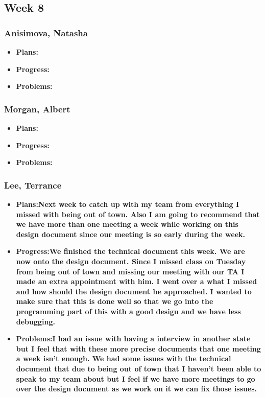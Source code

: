 \documentclass[10pt,draftclsnofoot,onecolumn]{IEEEtran}
\begin{document}
\subsection{Week 8}
\subsubsection{Anisimova, Natasha}
\begin{itemize}
	\item \textbf{Plans:}
	\item \textbf{Progress:}
	\item \textbf{Problems:}
\end{itemize}
\subsubsection{Morgan, Albert}
\begin{itemize}
	\item \textbf{Plans:}
	\item \textbf{Progress:}
	\item \textbf{Problems:}
\end{itemize}
\subsubsection{Lee, Terrance}
\begin{itemize}
	\item \textbf{Plans:Next week to catch up with my team from everything I missed with being out of town. Also I am going to recommend that we have more than one meeting a week while working on this design document since our meeting is so early during the week.}
	\item \textbf{Progress:We finished the technical document this week. We are now onto the design document. Since I missed class on Tuesday from being out of town and missing our meeting with our TA I made an extra appointment with him. I went over a what I missed and how should the design document be approached. I wanted to make sure that this is done well so that we go into the programming part of this with a good design and we have less debugging.}
	\item \textbf{Problems:I had an issue with having a interview in another state but I feel that with these more precise documents that one meeting a week isn't enough. We had some issues with the technical document that due to being out of town that I haven't been able to speak to my team about but I feel if we have more meetings to go over the design document as we work on it we can fix those issues.}
\end{itemize}
\end{document}
